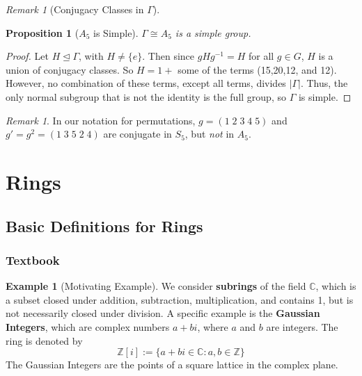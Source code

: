 \documentclass[12pt]{article}
\newtheorem{prop}[thm]{Proposition}
\theoremstyle{definition}
\newtheorem{eg}[thm]{Example}
\theoremstyle{remark}
\newtheorem{rmk}[thm]{Remark}
\numberwithin{equation}{section}
\newcommand\C{\mathbb C}    %
\newcommand\Z{\mathbb Z}    %
\newcommand\B[1]{\textbf{ #1}}
\newcommand\nsub{\trianglelefteq}
\begin{document}
\begin{rmk}[Conjugacy Classes in $\Gamma$]
\end{rmk}


\vspace{15pt}

\begin{prop}[$A_5$ is Simple]
        $\Gamma \cong A_5$ is a simple group.
\end{prop}
\begin{proof}
        Let $H \nsub \Gamma$, with $H \neq \{e\}$. Then since $gHg^{-1} = H$ for all $g \in G$, $H$ is a union of conjugacy classes. So $H = 1 + $ some of the terms (15,20,12, and 12). However, no combination of these terms, except all terms, divides $|\Gamma|$. Thus, the only normal subgroup that is not the identity is the full group, so $\Gamma$ is simple.
\end{proof}

\vspace{15pt}

\begin{rmk}
        In our notation for permutations, $g = (1\;2\;3\;4\;5)$ and $g' = g^2 = (1\;3\;5\;2\;4)$ are conjugate in $S_5$, but \emph{not} in $A_5$.
\end{rmk}


\clearpage


\section{Rings}

\subsection{Basic Definitions for Rings}

\subsubsection{Textbook}

\begin{eg}[Motivating Example]
        We consider \B{subrings} of the field $\C$, which is a subset closed under addition, subtraction, multiplication, and contains 1, but is not necessarily closed under division. A specific example is the \B{Gaussian Integers}, which are complex numbers $a+bi$, where $a$ and $b$ are integers. The ring is denoted by \begin{equation}
                \Z[i] := \{a+bi \in \C: a,b \in \Z\}
        \end{equation}
        The Gaussian Integers are the points of a square lattice in the complex plane.
\end{eg}
\end{document}

